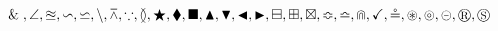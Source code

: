 $
      \And,
      \angle,
      \approxeq,
      \backsim,
      \backsimeq,
      \backslash,
      \barwedge,
      \because,
      \between,
      \bigstar,
      \blacklozenge,
      \blacksquare,
      \blacktriangle,
      \blacktriangledown,
      \blacktriangleleft,
      \blacktriangleright,
      \boxminus,
      \boxplus,
      \boxtimes,
      \Bumpeq,
      \bumpeq,
      \Cap,
      \checkmark,
      \circeq,
      \circledast,
      \circledcirc,
      \circleddash,
      \circledR,
      \circledS
$